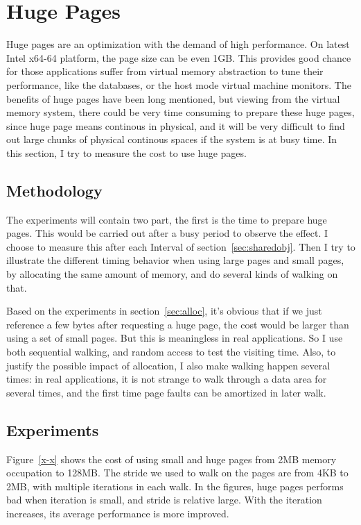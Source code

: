 \section{Huge Pages}
	\label{sec:hugepage}
Huge pages are an optimization with the demand of high performance. On latest
Intel x64-64 platform, the page size can be even 1GB. This provides good
chance for those applications suffer from virtual memory abstraction to tune
their performance, like the databases, or the host mode virtual machine monitors.
The benefits of huge pages have been long mentioned, but viewing from the
virtual memory system, there could be very time consuming to prepare these
huge pages, since huge page means continous in physical, and it will be very
difficult to find out large chunks of physical continous spaces if the system is
at busy time. In this section, I try to measure the cost to use huge pages.

\subsection{Methodology}
The experiments will contain two part, the first is the time to prepare huge
pages. This would be carried out after a busy period to observe the effect. I
choose to measure this after each Interval of section~\ref{sec:sharedobj}. Then
I try to illustrate the different timing behavior when using large pages and
small pages, by allocating the same amount of memory, and do several kinds of
walking on that.

Based on the experiments in section~\ref{sec:alloc}, it's obvious that if we
just reference a few bytes after requesting a huge page, the cost would be
larger than using a set of small pages. But this is meaningless in real
applications. So I use both sequential walking, and random access to test
the visiting time. Also, to justify the possible impact of allocation, I
also make walking happen several times: in real applications, it is not
strange to walk through a data area for several times, and the first time
page faults can be amortized in later walk.

\subsection{Experiments}
Figure~\ref{x-x} shows the cost of using small and huge pages from 2MB memory
occupation to 128MB. The stride we used to walk on the pages are from 4KB to
2MB, with multiple iterations in each walk. In the figures, huge pages performs
bad when iteration is small, and stride is relative large. With the iteration
increases, its average performance is more improved.

